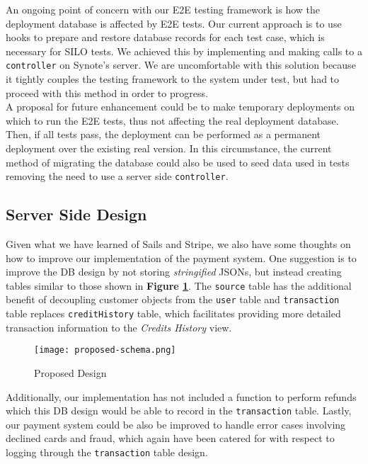 An ongoing point of concern with our E2E testing framework is how the deployment database is affected by E2E tests. Our current approach is to use hooks to prepare and restore database records for each test case, which is necessary for SILO tests. We achieved this by implementing and making calls to a \texttt{controller} on Synote's server. We are uncomfortable with this solution because it tightly couples the testing framework to the system under test, but had to proceed with this method in order to progress.\\

A proposal for future enhancement could be to make temporary deployments on which to run the E2E tests, thus not affecting the real deployment database. Then, if all tests pass, the deployment can be performed as a permanent deployment over the existing real version. In this circumstance, the current method of migrating the database could also be used to seed data used in tests removing the need to use a server side \texttt{controller}.

\subsection{Server Side Design}
\label{subsec:server-side-design}

Given what we have learned of Sails and Stripe, we also have some thoughts on how to improve our implementation of the payment system. One suggestion is to improve the DB design by not storing \textit{stringified} JSONs, but instead creating tables similar to those shown in \textbf{Figure \ref{fig:proposed-schema}}. The \texttt{source} table has the additional benefit of decoupling customer objects from the \texttt{user} table and \texttt{transaction} table replaces \texttt{creditHistory} table, which facilitates providing more detailed transaction information to the \textit{Credits History} view.\\

\begin{figure}[!hbt]
  	\centering
 	\texttt{[image: proposed-schema.png]}
  	\caption{Proposed Design}
 	\label{fig:proposed-schema}
\end{figure}

Additionally, our implementation has not included a function to perform refunds which this DB design would be able to record in the \texttt{transaction} table. Lastly, our payment system could be also be improved to handle error cases involving declined cards and fraud, which again have been catered for with respect to logging through the \texttt{transaction} table design.

